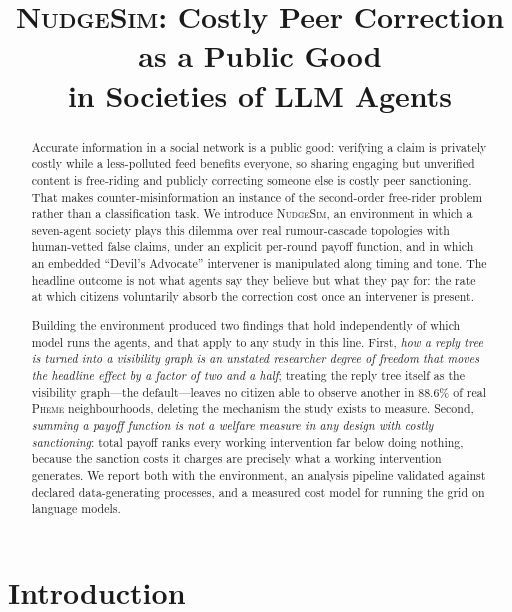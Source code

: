 \documentclass{article}
\title{\textsc{NudgeSim}: Costly Peer Correction as a Public Good\\
in Societies of LLM Agents}
\author{}
\date{}
\begin{document}
\maketitle

\begin{abstract}
Accurate information in a social network is a public good: verifying a claim is
privately costly while a less-polluted feed benefits everyone, so sharing
engaging but unverified content is free-riding and publicly correcting someone
else is costly peer sanctioning. That makes counter-misinformation an instance
of the second-order free-rider problem rather than a classification task. We
introduce \textsc{NudgeSim}, an environment in which a seven-agent society plays
this dilemma over real rumour-cascade topologies with human-vetted false claims,
under an explicit per-round payoff function, and in which an embedded
``Devil's Advocate'' intervener is manipulated along timing and tone. The
headline outcome is not what agents say they believe but what they pay for: the
rate at which citizens voluntarily absorb the correction cost once an intervener
is present.

Building the environment produced two findings that hold independently of which
model runs the agents, and that apply to any study in this line. First,
\emph{how a reply tree is turned into a visibility graph is an unstated
researcher degree of freedom that moves the headline effect by a factor of two
and a half}; treating the reply tree itself as the visibility graph---the
default---leaves no citizen able to observe another in 88.6\% of real
\textsc{Pheme} neighbourhoods, deleting the mechanism the study exists to
measure. Second, \emph{summing a payoff function is not a welfare measure in any
design with costly sanctioning}: total payoff ranks every working intervention
far below doing nothing, because the sanction costs it charges are precisely
what a working intervention generates. We report both with the environment, an
analysis pipeline validated against declared data-generating processes, and a
measured cost model for running the grid on language models.
\end{abstract}

\section{Introduction}
\end{document}
